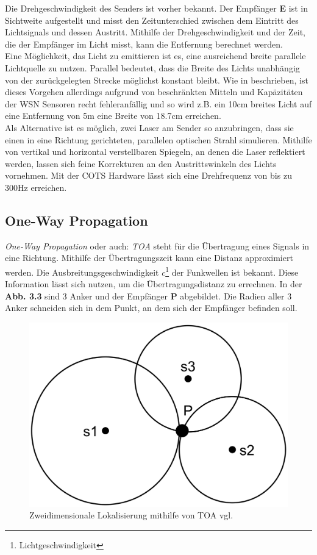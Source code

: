 \documentclass[12pt, a4wide]{scrreprt}
\begin{document}
Die Drehgeschwindigkeit des Senders ist vorher bekannt. Der Empfänger {\bf E} ist in Sichtweite aufgestellt und misst den Zeitunterschied zwischen dem Eintritt des Lichtsignals und dessen Austritt. Mithilfe der Drehgeschwindigkeit und der Zeit, die der Empfänger im Licht misst, kann die Entfernung berechnet werden.\\
\indent
Eine Möglichkeit, das Licht zu emittieren ist es, eine ausreichend breite parallele Lichtquelle zu nutzen. Parallel bedeutet, dass die Breite des Lichts unabhängig von der zurückgelegten Strecke möglichst konstant bleibt. Wie in \cite{lighthouse} beschrieben, ist dieses Vorgehen allerdings aufgrund von beschränkten Mitteln und Kapäzitäten der WSN Sensoren recht fehleranfällig und so wird z.B. ein 10cm breites Licht auf eine Entfernung von 5m eine Breite von 18.7cm erreichen.\\
\indent
Als Alternative ist es möglich, zwei Laser am Sender so anzubringen, dass sie einen in eine Richtung gerichteten, parallelen optischen Strahl simulieren. Mithilfe von vertikal und horizontal verstellbaren Spiegeln, an denen die Laser reflektiert werden, lassen sich feine Korrekturen an den Austrittswinkeln des Lichts vornehmen. Mit der \ac{COTS} Hardware lässt sich eine Drehfrequenz von bis zu 300Hz\cite{lighthouse} erreichen. 

    \subsection{One-Way Propagation}
\textit{One-Way Propagation} oder auch: \textit{\ac{TOA}} steht für die Übertragung eines Signals in eine Richtung\cite{toa}. Mithilfe der Übertragungszeit kann eine Distanz approximiert werden. Die Ausbreitungsgeschwindigkeit $c$\footnote{Lichtgeschwindigkeit} der Funkwellen ist bekannt. Diese Information lässt sich nutzen, um die Übertragungsdistanz zu errechnen. In der {\bf Abb. 3.3} sind 3 Anker und der Empfänger {\bf P} abgebildet. Die Radien aller 3 Anker schneiden sich in dem Punkt, an dem sich der Empfänger befinden soll.

\begin{figure}[!htb]
\centering
\includegraphics[scale=.07]{toa.png}
\caption{Zweidimensionale Lokalisierung mithilfe von TOA vgl.\cite{toa}}
\end{figure}
\end{document}
